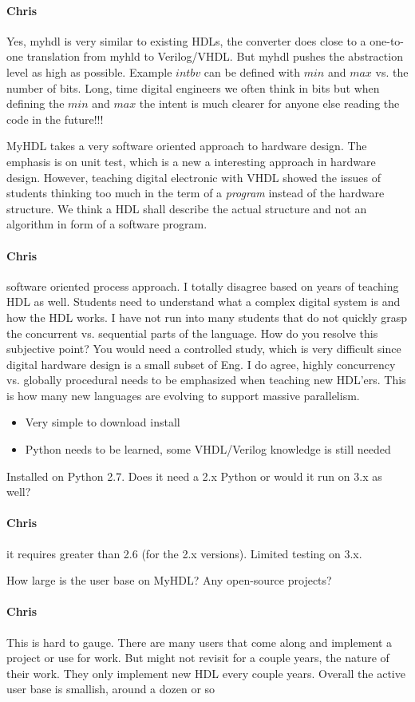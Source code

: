 \documentclass[10pt, technote, draftcls, onecolumn]{IEEEtran}
\newcommand{\comment}[3]{\paragraph*{\textbf{#1}}{\color{#3}#2}}
\newcommand{\cfelton}[1]{\comment{Chris}{#1}{Blue}}
\begin{document}
\cfelton{Yes, myhdl is very similar to existing HDLs, the converter does close 
to a one-to-one translation from myhld to Verilog/VHDL.  But myhdl pushes the 
abstraction level as high as possible.  Example $intbv$ can be defined with 
$min$ and $max$ vs. the number of bits.  Long, time digital engineers we often
think in bits but when defining the $min$ and $max$ the intent is much clearer
for anyone else reading the code in the future!!!}

MyHDL takes a very software oriented approach to hardware design. The emphasis
is on unit test, which is a new a interesting approach in hardware design.
However, teaching digital electronic with VHDL showed the issues of students
thinking too much in the term of a \emph{program} instead of the hardware
structure. We think a HDL shall describe the actual structure and not an
algorithm in form of a software program.

\cfelton{software oriented \b{process} approach.  I totally disagree based on 
years of teaching HDL as well.  Students need to understand what a complex
digital system is and how the HDL works.  I have not run into many students
that do not quickly grasp the concurrent vs. sequential parts of the language.
How do you resolve this subjective point?  You would need a controlled study,
which is very difficult since digital hardware design is a small subset of 
Eng.  I do agree, highly concurrency vs. globally procedural needs to be 
emphasized when teaching new HDL'ers.  This is how many new languages are
evolving to support massive parallelism.}

\begin{itemize}
\item Very simple to download install
\item Python needs to be learned, some VHDL/Verilog knowledge is still needed
\end{itemize}

Installed on Python 2.7. Does it need a 2.x Python or would it run on 3.x as well?

\cfelton{it requires greater than 2.6 (for the 2.x versions).  Limited testing 
on 3.x.}

How large is the user base on MyHDL? Any open-source projects?

\cfelton{This is hard to gauge.  There are many users that come along and implement
a project or use for work.  But might not revisit for a couple years, the nature of 
their work.  They only implement new HDL every couple years.  Overall the active
user base is smallish, around a dozen or so}
\end{document}
